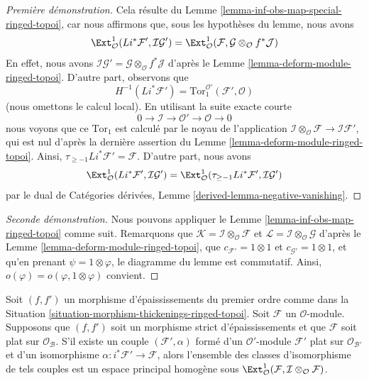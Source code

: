 \begin{proof}[Première démonstration]
Cela résulte du Lemme \ref{lemma-inf-obs-map-special-ringed-topoi}, car nous
affirmons que, sous les hypothèses du lemme, nous avons
$$
\Ext^1_\mathcal{O}(Li^*\mathcal{F}', \mathcal{I}\mathcal{G}') =
\Ext^1_\mathcal{O}(\mathcal{F},
\mathcal{G} \otimes_\mathcal{O} f^*\mathcal{J})
$$
En effet, nous avons
$\mathcal{I}\mathcal{G}' =
\mathcal{G} \otimes_\mathcal{O} f^*\mathcal{J}$ d'après le
Lemme \ref{lemma-deform-module-ringed-topoi}.
D'autre part, observons que
$$
H^{-1}(Li^*\mathcal{F}') =
\text{Tor}_1^{\mathcal{O}'}(\mathcal{F}', \mathcal{O})
$$
(nous omettons le calcul local). En utilisant la suite exacte courte
$$
0 \to \mathcal{I} \to \mathcal{O}' \to \mathcal{O} \to 0
$$
nous voyons que ce $\text{Tor}_1$ est calculé par le noyau de l'application
$\mathcal{I} \otimes_\mathcal{O} \mathcal{F} \to \mathcal{I}\mathcal{F}'$,
qui est nul d'après la dernière assertion du
Lemme \ref{lemma-deform-module-ringed-topoi}.
Ainsi, $\tau_{\geq -1}Li^*\mathcal{F}' = \mathcal{F}$.
D'autre part, nous avons
$$
\Ext^1_\mathcal{O}(Li^*\mathcal{F}',
\mathcal{I}\mathcal{G}') =
\Ext^1_\mathcal{O}(\tau_{\geq -1}Li^*\mathcal{F}',
\mathcal{I}\mathcal{G}')
$$
par le dual de Catégories dérivées,
Lemme \ref{derived-lemma-negative-vanishing}.
\end{proof}

\begin{proof}[Seconde démonstration]
Nous pouvons appliquer le Lemme \ref{lemma-inf-obs-map-ringed-topoi} comme
suit. Remarquons que
$\mathcal{K} = \mathcal{I} \otimes_\mathcal{O} \mathcal{F}$ et
$\mathcal{L} = \mathcal{I} \otimes_\mathcal{O} \mathcal{G}$ d'après le
Lemme \ref{lemma-deform-module-ringed-topoi}, que
$c_{\mathcal{F}'} = 1 \otimes 1$ et $c_{\mathcal{G}'} = 1 \otimes 1$, et
qu'en prenant $\psi = 1 \otimes \varphi$, le diagramme du lemme est commutatif.
Ainsi, $o(\varphi) = o(\varphi, 1 \otimes \varphi)$ convient.
\end{proof}

\begin{lemma}
\label{lemma-inf-ext-rel-ringed-topoi}
Soit $(f, f')$ un morphisme d'épaississements du premier ordre comme dans la
Situation \ref{situation-morphism-thickenings-ringed-topoi}.
Soit $\mathcal{F}$ un $\mathcal{O}$-module.
Supposons que $(f, f')$ soit un morphisme strict d'épaississements et que
$\mathcal{F}$ soit plat sur $\mathcal{O}_\mathcal{B}$. S'il existe un couple
$(\mathcal{F}', \alpha)$ formé d'un $\mathcal{O}'$-module $\mathcal{F}'$ plat
sur $\mathcal{O}_{\mathcal{B}'}$ et d'un isomorphisme
$\alpha : i^*\mathcal{F}' \to \mathcal{F}$, alors l'ensemble des classes
d'isomorphisme de tels couples est un espace principal homogène sous
$\Ext^1_\mathcal{O}(
\mathcal{F}, \mathcal{I} \otimes_\mathcal{O} \mathcal{F})$.
\end{lemma}

